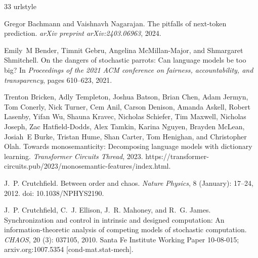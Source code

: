 \documentclass{article}
\begin{document}
\begin{thebibliography}{33}
\providecommand{\natexlab}[1]{#1}
\providecommand{\url}[1]{\texttt{#1}}
\expandafter\ifx\csname urlstyle\endcsname\relax
  \providecommand{\doi}[1]{doi: #1}\else
  \providecommand{\doi}{doi: \begingroup \urlstyle{rm}\Url}\fi

Gregor Bachmann and Vaishnavh Nagarajan.
\newblock The pitfalls of next-token prediction.
\newblock \emph{arXiv preprint arXiv:2403.06963}, 2024.

Emily~M Bender, Timnit Gebru, Angelina McMillan-Major, and Shmargaret Shmitchell.
\newblock On the dangers of stochastic parrots: Can language models be too big?
\newblock In \emph{Proceedings of the 2021 ACM conference on fairness, accountability, and transparency}, pages 610--623, 2021.

Trenton Bricken, Adly Templeton, Joshua Batson, Brian Chen, Adam Jermyn, Tom Conerly, Nick Turner, Cem Anil, Carson Denison, Amanda Askell, Robert Lasenby, Yifan Wu, Shauna Kravec, Nicholas Schiefer, Tim Maxwell, Nicholas Joseph, Zac Hatfield-Dodds, Alex Tamkin, Karina Nguyen, Brayden McLean, Josiah~E Burke, Tristan Hume, Shan Carter, Tom Henighan, and Christopher Olah.
\newblock Towards monosemanticity: Decomposing language models with dictionary learning.
\newblock \emph{Transformer Circuits Thread}, 2023.
\newblock https://transformer-circuits.pub/2023/monosemantic-features/index.html.

J.~P. Crutchfield.
\newblock Between order and chaos.
\newblock \emph{Nature Physics}, 8 (January): 17--24, 2012.
\newblock \doi{10.1038/NPHYS2190}.

J.~P. Crutchfield, C.~J. Ellison, J.~R. Mahoney, and R.~G. James.
\newblock Synchronization and control in intrinsic and designed computation: {An} information-theoretic analysis of competing models of stochastic computation.
\newblock \emph{CHAOS}, 20 (3): 037105, 2010.
\newblock Santa Fe Institute Working Paper 10-08-015; arxiv.org:1007.5354 [cond-mat.stat-mech].


\end{thebibliography}
\end{document}
